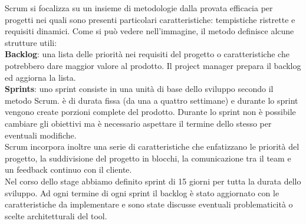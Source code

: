 Scrum si focalizza su un insieme di metodologie dalla provata efficacia per
progetti nei quali sono presenti particolari caratteristiche: tempistiche
ristrette e requisiti dinamici.
Come si può vedere nell'immagine, il metodo definisce alcune strutture utili:\\
\textbf{Backlog}: una lista delle priorità nei requisiti del progetto o caratteristiche
che potrebbero dare maggior valore al prodotto.
Il project manager prepara il backlog ed aggiorna la lista.\\
\textbf{Sprints}: uno sprint consiste in una unità di base dello sviluppo
secondo il metodo Scrum. è di durata fissa (da una a quattro settimane) e
durante lo sprint vengono create porzioni complete del prodotto.
Durante lo sprint non è possibile cambiare  gli obiettivi ma è necessario
aspettare il termine dello stesso per eventuali modifiche.\\
Scrum incorpora inoltre una serie di caratteristiche che enfatizzano le
priorità del progetto, la suddivisione del progetto in blocchi, la comunicazione
tra il team e un feedback continuo con il cliente.\\
Nel corso dello stage abbiamo definito sprint di 15 giorni per tutta la durata dello sviluppo.
Ad ogni termine di ogni sprint il backlog è stato aggiornato con le
caratteristiche da implementare e sono state discusse eventuali problematicità
o scelte architetturali del tool.


